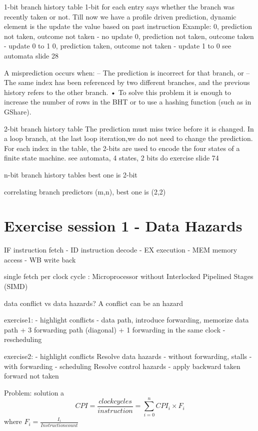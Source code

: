 1-bit branch history table
1-bit for each entry says whether the branch was recently taken or not.
Till now we have a profile driven prediction, dynamic element is the update the value based on past instruction
Example:
0, prediction not taken, outcome not taken - no update
0, prediction not taken, outcome taken - update 0 to 1
0, prediction taken, outcome not taken - update 1 to 0
see automata slide 28

A misprediction occurs when:
– The prediction is incorrect for that branch, or
– The same index has been referenced by two different branches, and the previous history refers to the other branch.
    • To solve this problem it is enough to increase the number of rows in the BHT or to use a hashing function (such as in GShare).

2-bit branch history table
The prediction must miss twice before it is changed.
In a loop branch, at the last loop iteration,we do not need to change the prediction.
For each index in the table, the 2-bits are used to encode the four states of a finite state machine.
see automata, 4 states, 2 bits
do exercise slide 74

n-bit branch history tables
best one is 2-bit

correlating branch predictors
(m,n), best one is (2,2)



\section{Exercise session 1 - Data Hazards}\label{sec:exercise-session-1}
IF instruction fetch - ID instruction decode - EX execution - MEM memory access - WB write back

single fetch per clock cycle : Microprocessor without Interlocked Pipelined Stages (SIMD)

data conflict vs data hazards?
A conflict can be an hazard

exercise1:
- highlight conflicts
- data path, introduce forwarding, memorize data path + 3 forwarding path (diagonal) + 1 forwarding in the same clock
- rescheduling

exercise2:
- highlight conflicts
Resolve data hazards
- without forwarding, stalls
- with forwarding
- scheduling
Resolve control hazards
- apply backward taken forward not taken

Problem:
solution a
\[CPI = \frac{clock cycles}{instruction} = \sum_{i=0}^{n} CPI_i \times F_i\]
where \(F_i = \frac{I_i}{Instruction count}\)

